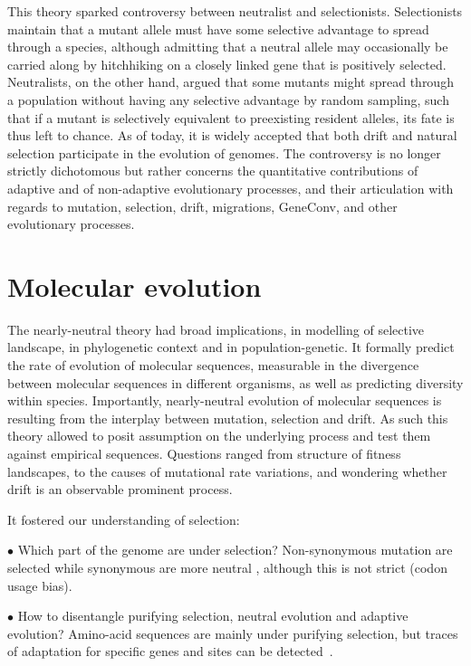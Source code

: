 This theory sparked controversy between neutralist and selectionists.
Selectionists maintain that a mutant \gls{allele} must have some selective advantage to spread through a species, although admitting that a \gls{neutral} \gls{allele} may occasionally be carried along by hitchhiking on a closely linked gene that is positively selected.
Neutralists, on the other hand, argued that some mutants might spread through a population without having any selective advantage by random sampling, such that if a mutant is selectively equivalent to preexisting resident \glspl{allele}, its fate is thus left to chance.
As of today, it is widely accepted that both \gls{drift} and natural selection participate in the evolution of genomes.
The controversy is no longer strictly dichotomous but rather concerns the quantitative contributions of adaptive and of non-adaptive evolutionary processes, and their articulation with regards to mutation, selection, drift, migrations, \gls{GeneConv}, and other evolutionary processes.

\section{Molecular evolution}

The nearly-neutral theory had broad implications, in modelling of selective landscape, in phylogenetic context and in population-genetic.
It formally predict the rate of evolution of molecular sequences, measurable in the divergence between molecular sequences in different organisms, as well as predicting diversity within species.
Importantly, nearly-neutral evolution of molecular sequences is resulting from the interplay between mutation, selection and drift.
As such this theory allowed to posit assumption on the underlying process and test them against empirical sequences.
Questions ranged from structure of fitness landscapes, to the causes of mutational rate variations, and wondering whether drift is an observable prominent process.

It fostered our understanding of selection:

$\bullet$ Which part of the genome are under selection?
Non-synonymous mutation are selected while synonymous are more neutral \cite{Muse1994,Goldman1994}, although this is not strict (codon usage bias).

$\bullet$ How to disentangle purifying selection, neutral evolution and adaptive evolution?
Amino-acid sequences are mainly under purifying selection, but traces of adaptation for specific genes and sites can be detected~\citep{McDonald1991, enard_viruses_2016}.

